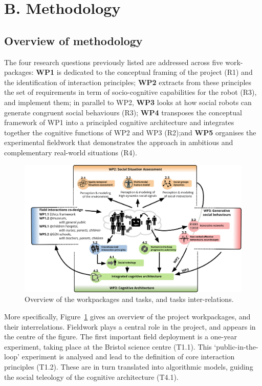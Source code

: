 \section{B. Methodology}

\subsection{Overview of \project methodology}

\begin{rewrite}

The four research questions previously listed are addressed across five
work-packages: \textbf{WP1} is dedicated to the conceptual framing of the
project (R1) and the identification of interaction principles; \textbf{WP2}
extracts from these principles the set of requirements in term of
socio-cognitive capabilities for the robot (R3), and implement them; in parallel
to WP2,  \textbf{WP3} looks at how social robots can generate congruent social
behaviours (R3); \textbf{WP4} transposes the conceptual framework of WP1 into a
principled cognitive architecture and integrates together the cognitive
functions of WP2 and WP3 (R2);and \textbf{WP5} organises the experimental
fieldwork that demonstrates the \project approach in ambitious and complementary
real-world situations (R4).



\begin{figure}[h!]
\centering
\includegraphics[width=\linewidth]{figs/wps}
\caption{Overview of the workpackages and tasks, and tasks inter-relations.}
\label{fig:wps}
\end{figure}

More specifically, Figure~\ref{fig:wps} gives an overview of the project
workpackages, and their interrelations. Fieldwork plays a central role in the
project, and appears in the centre of the figure. The first important field
deployment is a one-year experiment, taking place at the Bristol science centre
(T1.1). This `public-in-the-loop' experiment is analysed and lead to the
definition of core interaction principles (T1.2). These are in turn translated
into algorithmic models, guiding the social teleology of the cognitive
architecture (T4.1).


\end{rewrite}
